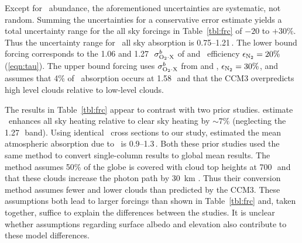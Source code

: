 \documentclass[agupp,twoside]{aguplus} %
\begin{document}
Except for \OdX\ abundance, the aforementioned uncertainties are
systematic, not random. 
Summing the uncertainties for a conservative error estimate yields a
total uncertainty range for the all sky forcings in
Table~\ref{tbl:frc} of $-20$ to $+30\%$.     
Thus the uncertainty range for \OdX\ all sky absorption is
0.75--1.21\,\wxmS. 
The lower bound forcing corresponds to the 1.06 and 1.27\,\um\
$\sigma^{b}_{\mathrm{O}_{2} \cdot \mathrm{X}}$ of \cite{MCB98} and \Nd\ efficiency $\epsilon_{\mathrm{N}_{2}} = 20\%$
(\ref{eqn:tau}).   
The upper bound forcing uses $\sigma^{b}_{\mathrm{O}_{2} \cdot \mathrm{X}}$ from \cite{GOB90} and
\cite{SPS98}, $\epsilon_{\mathrm{N}_{2}} = 30\%$, and assumes that 4\% of \OdX\
absorption occurs at 1.58\,\um\ and that the CCM3 overpredicts high
level clouds relative to low-level clouds.  

The results in Table~\ref{tbl:frc} appear to contrast with two prior
studies. 
\cite{PEP97} estimate \OdOd\ enhances all sky heating relative to
clear sky heating by $\sim 7\%$ (neglecting the 1.27\,\um\ band).
Using identical \OdX\ cross sections to our study, \cite{SPS98}
estimated the mean atmospheric absorption due to \OdX\ is
0.9--1.3\,\wxmS. 
Both these prior studies used the same method to convert single-column
results to global mean results.
The method assumes 50\% of the globe is covered with cloud top heights
at 700\,\mb\ and that these clouds increase the photon path by 30~km
\cite[]{PEP97}.
Thus their conversion method assumes fewer and lower clouds than
predicted by the CCM3.
These assumptions both lead to larger forcings than shown in
Table~\ref{tbl:frc} and, taken together, suffice to explain the
differences between the studies.  
It is unclear whether assumptions regarding surface albedo and
elevation also contribute to these model differences.

\end{document}
